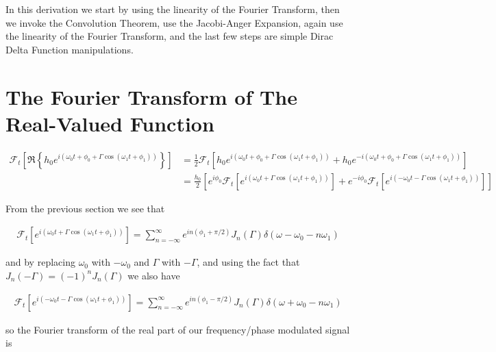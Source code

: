 \documentclass[onecolumn, groupedaddress, 10pt]{revtex4-1}
\begin{document}
In this derivation we start by using the linearity of the Fourier Transform, then we invoke the Convolution Theorem, use the Jacobi-Anger Expansion, again use the linearity of the Fourier Transform, and the last few steps are simple Dirac Delta Function manipulations.

\section{The Fourier Transform of The Real-Valued Function}

\begin{align}
\mathcal{F}_t \left[ \Re \left\{ h_0 e^{i\left( \omega_0 t + \phi_0 + \Gamma \cos( \omega_1 t + \phi_1 ) \right)} \right\} \right]
&= \frac{1}{2} \mathcal{F}_t \left[ h_0 e^{i\left( \omega_0 t + \phi_0 + \Gamma \cos( \omega_1 t + \phi_1 ) \right)} 
                        + h_0 e^{-i\left( \omega_0 t + \phi_0 + \Gamma \cos( \omega_1 t + \phi_1 ) \right)} \right]			\\
&= \frac{h_0}{2} \left[ 
  e^{ i\phi_0} \mathcal{F}_t \left[ e^{i\left(  \omega_0 t + \Gamma \cos( \omega_1 t + \phi_1 ) \right)} \right] 
+ e^{-i\phi_0} \mathcal{F}_t \left[ e^{i\left( -\omega_0 t - \Gamma \cos( \omega_1 t + \phi_1 ) \right)} \right] 
\right]
\end{align}

From the previous section we see that

\begin{align}
\mathcal{F}_t \left[ e^{i(\omega_0 t + \Gamma \cos(\omega_1 t + \phi_1))} \right] 
= \sum_{n=-\infty}^{\infty} e^{in(\phi_1 + \pi/2)} J_n(\Gamma)  \delta(\omega - \omega_0 - n\omega_1)
\end{align}

and by replacing $\omega_0$ with $-\omega_0$ and $\Gamma$ with $-\Gamma$, and using the fact that $J_n(-\Gamma) = (-1)^n J_n (\Gamma)$ we also have

\begin{align}
\mathcal{F}_t \left[ e^{i(-\omega_0 t - \Gamma \cos(\omega_1 t + \phi_1))} \right] 
= \sum_{n=-\infty}^{\infty} e^{in(\phi_1 - \pi/2)} J_n(\Gamma)  \delta(\omega + \omega_0 - n\omega_1)
\end{align}

so the Fourier transform of the real part of our frequency/phase modulated signal is
\end{document}
